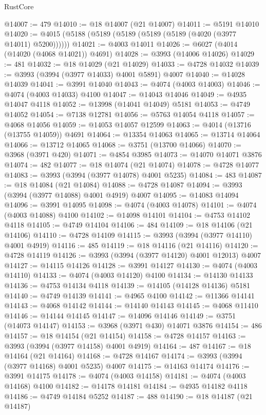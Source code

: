 \begin{lexlean}{RustCore}
\begin{coremodule}
@14007 := 479
@14010 := @18 @14007 (@21 @14007)
@14011 := @5191 @14010
@14020 := @4015 (@5188 (@5189 (@5189 (@5189 (@5189 (@4020 (@3977 @14011) @5200))))))
@14021 := @4003 @14011
@14026 := @6027 (@4014 (@14020 (@4068 @14021)) @4691)
@14028 := @3993 (@14006 @14026)
@14029 := 481
@14032 := @18 @14029 (@21 @14029)
@14033 := @4728 @14032
@14039 := @3993 (@3994 (@3977 @14033) @4001 @5891) @4007
@14040 := @14028 @14039
@14041 := @3991 @14040
@14043 := @4074 (@4003 @14003)
@14046 := @4074 (@4003 @14033) @4100
@14047 := @14043 @14046
@14049 := @4935 @14047 @4118
@14052 := @13998 (@14041 @14049) @5181
@14053 := @4749 @14052
@14054 := @7138 @12781
@14056 := @5763 @14054 @4118
@14057 := @4068 @14056
@14059 := @14053 @14057 @12599
@14063 := @4014 (@13716 (@13755 @14059)) @4691
@14064 := @13354 @14063
@14065 := @13714 @14064
@14066 := @13712 @14065
@14068 := @3751 (@13700 @14066)
@14070 := @3968 (@3971 @420)
@14071 := @4854 @3985
@14073 := @14070 @14071 @3876
@14074 := 482
@14077 := @18 @14074 (@21 @14074)
@14078 := @4728 @14077
@14083 := @3993 (@3994 (@3977 @14078) @4001 @5235)
@14084 := 483
@14087 := @18 @14084 (@21 @14084)
@14088 := @4728 @14087
@14094 := @3993 (@3994 (@3977 @14088) @4001 @4919) @4007
@14095 := @14083 @14094
@14096 := @3991 @14095
@14098 := @4074 (@4003 @14078)
@14101 := @4074 (@4003 @14088) @4100
@14102 := @14098 @14101
@14104 := @4753 @14102 @4118
@14105 := @4749 @14104
@14106 := 484
@14109 := @18 @14106 (@21 @14106)
@14110 := @4728 @14109
@14115 := @3993 (@3994 (@3977 @14110) @4001 @4919)
@14116 := 485
@14119 := @18 @14116 (@21 @14116)
@14120 := @4728 @14119
@14126 := @3993 (@3994 (@3977 @14120) @4001 @12013) @4007
@14127 := @14115 @14126
@14128 := @3991 @14127
@14130 := @4074 (@4003 @14110)
@14133 := @4074 (@4003 @14120) @4100
@14134 := @14130 @14133
@14136 := @4753 @14134 @4118
@14139 := @14105 (@14128 @14136) @5181
@14140 := @4749 @14139
@14141 := @4965 @4100
@14142 := @11366 @14141
@14143 := @4068 @14142
@14144 := @14140 @14143
@14145 := @4068 @11410
@14146 := @14144 @14145
@14147 := @14096 @14146
@14149 := @3751 (@14073 @14147)
@14153 := @3968 (@3971 @430) @14071 @3876
@14154 := 486
@14157 := @18 @14154 (@21 @14154)
@14158 := @4728 @14157
@14163 := @3993 (@3994 (@3977 @14158) @4001 @4919)
@14164 := 487
@14167 := @18 @14164 (@21 @14164)
@14168 := @4728 @14167
@14174 := @3993 (@3994 (@3977 @14168) @4001 @5235) @4007
@14175 := @14163 @14174
@14176 := @3991 @14175
@14178 := @4074 (@4003 @14158)
@14181 := @4074 (@4003 @14168) @4100
@14182 := @14178 @14181
@14184 := @4935 @14182 @4118
@14186 := @4749 @14184 @5252
@14187 := 488
@14190 := @18 @14187 (@21 @14187)

\end{coremodule}
\end{lexlean}
